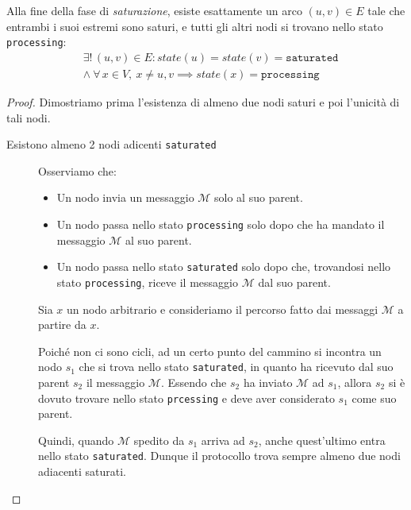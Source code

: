 \begin{teorema}[Correttezza]
    Alla fine della fase di \textit{saturazione}, esiste esattamente un arco $(u,v) \in E$
    tale che entrambi i suoi estremi sono saturi, e tutti gli altri nodi si trovano nello
    stato \texttt{processing}:
    \begin{align*}
        &\exists!\, (u,v) \in E : state(u) = state(v) = \texttt{saturated} \\
        &\land\ \forall\, x \in V,\ x \neq u,v \implies state(x) = \texttt{processing}
    \end{align*}
    \begin{proof}
        Dimostriamo prima l'esistenza di almeno due nodi saturi e poi l'unicità di tali nodi.
        \begin{description}
            \item[Esistono almeno 2 nodi adicenti \texttt{saturated}]
            Osserviamo che:
            \begin{itemize}
                \item Un nodo invia un messaggio $\mathcal{M}$ solo al suo parent.
                \item Un nodo passa nello stato \texttt{processing} solo dopo che ha mandato il messaggio $\mathcal{M}$ al suo parent.
                \item Un nodo passa nello stato \texttt{saturated} solo dopo che, trovandosi nello stato \texttt{processing}, riceve il messaggio $\mathcal{M}$ dal suo parent.
            \end{itemize}

            Sia $x$ un nodo arbitrario e consideriamo il percorso fatto dai messaggi $\mathcal{M}$ a partire da $x$. 
            
            Poiché non ci sono cicli, ad un certo punto del cammino si incontra un nodo $s_1$ che si trova nello stato \texttt{saturated}, in quanto ha ricevuto dal suo parent $s_2$ il messaggio $\mathcal{M}$. Essendo che $s_2$ ha inviato $\mathcal{M}$ ad $s_1$, allora $s_2$ si è dovuto trovare nello stato \texttt{prcessing} e deve aver considerato $s_1$ come suo parent.

            Quindi, quando $\mathcal{M}$ spedito da $s_1$ arriva ad $s_2$, anche quest'ultimo entra nello stato \texttt{saturated}. Dunque il protocollo trova sempre almeno due nodi adiacenti saturati.
            \begin{center}
                
                \begin{tikzpicture}[
                    node/.style={circle, draw, minimum size=0.7cm},
                    >=stealth
                    ]
                    

\end{tikzpicture}
\end{center}
\end{description}
\end{proof}
\end{teorema}
